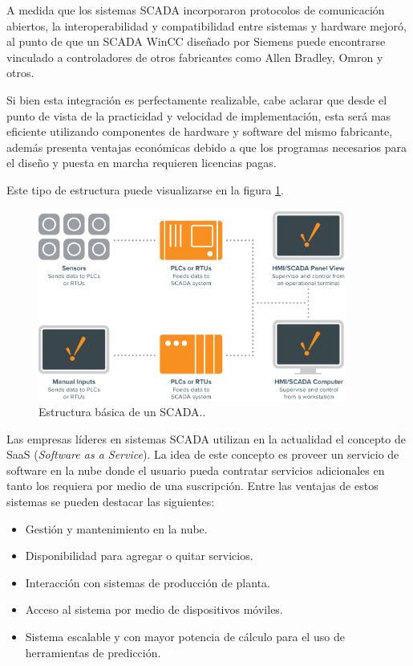 A medida que los sistemas SCADA incorporaron protocolos de comunicación abiertos, la interoperabilidad y compatibilidad entre sistemas y hardware mejoró, al punto de que un SCADA WinCC diseñado por Siemens puede encontrarse vinculado a controladores de otros fabricantes como Allen Bradley, Omron y otros.

Si bien esta integración es perfectamente realizable, cabe aclarar que desde el punto de vista de la practicidad y velocidad de implementación, esta será mas eficiente utilizando componentes de hardware y software del mismo fabricante, además presenta ventajas económicas debido a que los programas necesarios para el diseño y puesta en marcha requieren licencias pagas.

Este tipo de estructura puede visualizarse en la figura \ref{fig:SCNOW}.

\begin{figure}[htbp]
	\centering
	\includegraphics[width=0.9\textwidth]{./Figures/BasicSCADA.png}
	\caption{Estructura básica de un SCADA.\protect\footnotemark.}
	\label{fig:SCNOW}
\end{figure}
 
Las empresas líderes en sistemas SCADA utilizan en la actualidad el concepto de SaaS (\textit{Software as a Service}). La idea de este concepto es proveer un servicio de software en la nube donde el usuario pueda contratar servicios adicionales en tanto los requiera por medio de una suscripción. Entre las ventajas de estos sistemas se pueden destacar las siguientes:

\begin{itemize}
	\item Gestión y mantenimiento en la nube.
	\item Disponibilidad para agregar o quitar servicios.
	\item Interacción con sistemas de producción de planta.
	\item Acceso al sistema por medio de dispositivos móviles. 
	\item Sistema escalable y con mayor potencia de cálculo para el uso de herramientas de predicción.
\end{itemize}

